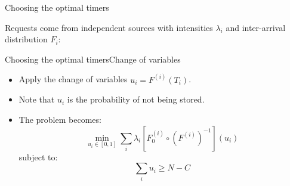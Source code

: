 \documentclass[aspectratio=169]{beamer}
\newenvironment*{myitem}[1][1.5em]{\begin{itemize}\setlength{\itemsep}{#1}}{\end{itemize}}
\begin{document}
\begin{frame}{Choosing the optimal timers}

	Requests come from independent sources with intensities $\lambda_i$ and inter-arrival distribution $F_i$:

	\vfill

	\vfill
	\pause
\end{frame}

\begin{frame}{Choosing the optimal timers}{Change of variables}
	
	\begin{myitem}[1.5em]
	\item Apply the change of variables $u_i = F^{(i)}(T_i)$. 
	\item Note that $u_i$ is the probability of \alert{not being stored}. 
	
	\item The problem becomes:
	\begin{equation*}
		\min_{u_i \in [0,1]} \sum_i \lambda_i \left[F_0^{(i)} \circ (F^{(i)})^{-1}\right](u_i)
	\end{equation*}
	subject to:
	\begin{equation*}
		\sum_i u_i \geqslant N-C
	\end{equation*}

	\end{myitem}

\end{frame}
\end{document}

